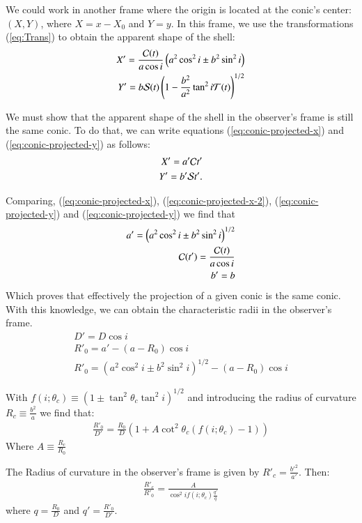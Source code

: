 We could work in another frame where the origin is located at the conic's center: $(X,Y)$, where $X=x-X_0$ and $Y=y$.
In this frame,  we use the transformations (\ref{eq:Trans})  to obtain the apparent shape of the shell:
\begin{align}
X' = \frac{\mathcal{C}(t)}{a\cos i}\left(a^2\cos^2 i \pm b^2\sin^2 i\right)  \label{eq:conic-projected-x}\\
Y'= b\mathcal{S}(t)\left(1-\frac{b^2}{a^2}\tan^2 i\mathcal{T}(t)\right)^{1/2}
\label{eq:conic-projected-y}
\end{align}


We must show that the apparent shape of the shell in the observer's frame is still the same conic. To do that, we can write equations
(\ref{eq:conic-projected-x}) and (\ref{eq:conic-projected-y}) as follows:
\begin{align}
X' = a'\mathcal{C} t' \label{eq:conic-projected-x-2} \\
Y' = b'\mathcal{S} t' \label{eq:conic-projected-y-2} . 
\end{align}

Comparing, (\ref{eq:conic-projected-x}), (\ref{eq:conic-projected-x-2}), (\ref{eq:conic-projected-y}) and (\ref{eq:conic-projected-y}) we find that
\begin{align}
a' = \left(a^2\cos^2 i \pm b^2\sin^2 i\right)^{1/2} \\
\mathcal{C}(t') = \frac{\mathcal{C}(t)}{a\cos i} \\
b' = b
\end{align} 
Which proves that effectively the projection of a given conic is the same conic. With this knowledge, we can obtain the characteristic radii in
the observer's frame.
\begin{align}
D' = D\cos i \\
R'_0 = a' - (a-R_0)\cos i \\
R'_0 = \left(a^2\cos^2 i \pm b^2\sin^2 i\right)^{1/2}  - (a-R_0)\cos i
\end{align}

With  $f(i;\theta_c)\equiv\left(1\pm\tan^2\theta_c\tan^2i\right)^{1/2}$ and introducing the
radius of curvature $R_c\equiv \frac{b^2}{a}$ we find that:
\begin{align}
\frac{R'_0}{D'}=\frac{R_0}{D}\left(1+A\cot^2\theta_c(f(i;\theta_c)-1) \right)
\end{align}
Where $A\equiv \frac{R_c}{R_0}$

The Radius of curvature in the observer's frame is given by $R'_c=\frac{b'^2}{a'}$. Then:
\begin{align}
\frac{R'_c}{R'_0} = \frac{A}{\cos^2 i f(i;\theta_c)\frac{q'}{q}}
\end{align}
where $q=\frac{R_0}{D}$ and $q' = \frac{R'_0}{D'}$. 

